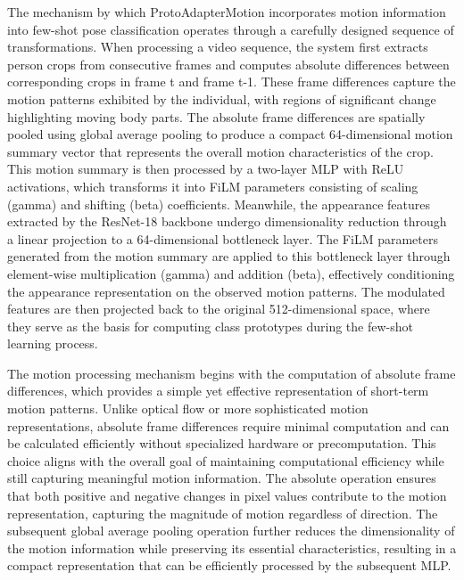 \documentclass[11pt]{article}
\begin{document}
The mechanism by which ProtoAdapterMotion incorporates motion information into few-shot pose classification operates through a carefully designed sequence of transformations. When processing a video sequence, the system first extracts person crops from consecutive frames and computes absolute differences between corresponding crops in frame t and frame t-1. These frame differences capture the motion patterns exhibited by the individual, with regions of significant change highlighting moving body parts. The absolute frame differences are spatially pooled using global average pooling to produce a compact 64-dimensional motion summary vector that represents the overall motion characteristics of the crop. This motion summary is then processed by a two-layer MLP with ReLU activations, which transforms it into FiLM parameters consisting of scaling (gamma) and shifting (beta) coefficients. Meanwhile, the appearance features extracted by the ResNet-18 backbone undergo dimensionality reduction through a linear projection to a 64-dimensional bottleneck layer. The FiLM parameters generated from the motion summary are applied to this bottleneck layer through element-wise multiplication (gamma) and addition (beta), effectively conditioning the appearance representation on the observed motion patterns. The modulated features are then projected back to the original 512-dimensional space, where they serve as the basis for computing class prototypes during the few-shot learning process.

The motion processing mechanism begins with the computation of absolute frame differences, which provides a simple yet effective representation of short-term motion patterns. Unlike optical flow or more sophisticated motion representations, absolute frame differences require minimal computation and can be calculated efficiently without specialized hardware or precomputation. This choice aligns with the overall goal of maintaining computational efficiency while still capturing meaningful motion information. The absolute operation ensures that both positive and negative changes in pixel values contribute to the motion representation, capturing the magnitude of motion regardless of direction. The subsequent global average pooling operation further reduces the dimensionality of the motion information while preserving its essential characteristics, resulting in a compact representation that can be efficiently processed by the subsequent MLP.
\end{document}
